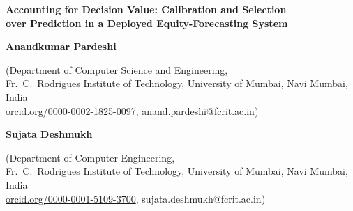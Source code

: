 \documentclass[10pt,a4paper,oneside]{article}
\theoremstyle{definition}
\theoremstyle{plain}
\begin{document}
\thispagestyle{plain}
\begin{center}
{\fontsize{14}{17}\selectfont\bfseries
Accounting for Decision Value: Calibration and Selection\\[2pt]
over Prediction in a Deployed Equity-Forecasting System\par}
\vspace{1.1em}

{\fontsize{10}{12}\selectfont\bfseries Anandkumar Pardeshi\par}
{\fontsize{9}{11}\selectfont
(Department of Computer Science and Engineering,\\
Fr.\ C.\ Rodrigues Institute of Technology, University of Mumbai, Navi Mumbai, India\\
\href{https://orcid.org/0000-0002-1825-0097}{orcid.org/0000-0002-1825-0097}, anand.pardeshi@fcrit.ac.in)\par}
\vspace{0.7em}

{\fontsize{10}{12}\selectfont\bfseries Sujata Deshmukh\par}
{\fontsize{9}{11}\selectfont
(Department of Computer Engineering,\\
Fr.\ C.\ Rodrigues Institute of Technology, University of Mumbai, Navi Mumbai, India\\
\href{https://orcid.org/0000-0001-5109-3700}{orcid.org/0000-0001-5109-3700}, sujata.deshmukh@fcrit.ac.in)\par}
\end{center}
\vspace{0.6em}
\end{document}
